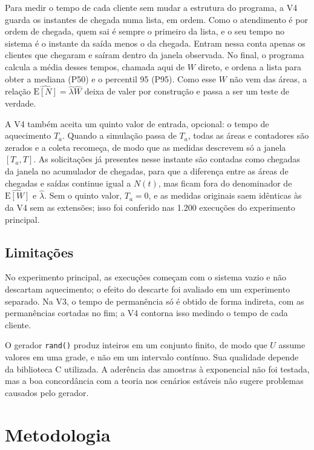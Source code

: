 \documentclass[
  article,      %
  10pt,         %
  oneside,
  a4paper,
  twocolumn,    %
  english,
  brazil        %
]{abntex2}
\newcommand{\EN}{\mathrm{E}[N]}
\newcommand{\EW}{\mathrm{E}[W]}
\begin{document}
Para medir o tempo de cada cliente sem mudar a estrutura do programa, a V4 guarda os instantes de chegada numa lista, em ordem. Como o atendimento é por ordem de chegada, quem sai é sempre o primeiro da lista, e o seu tempo no sistema é o instante da saída menos o da chegada. Entram nessa conta apenas os clientes que chegaram e saíram dentro da janela observada. No final, o programa calcula a média desses tempos, chamada aqui de $W$ direto, e ordena a lista para obter a mediana (P50) e o percentil 95 (P95). Como esse $W$ não vem das áreas, a relação $\widehat{\EN}=\widehat{\lambda}\widehat{W}$ deixa de valer por construção e passa a ser um teste de verdade.

A V4 também aceita um quinto valor de entrada, opcional: o tempo de aquecimento $T_a$. Quando a simulação passa de $T_a$, todas as áreas e contadores são zerados e a coleta recomeça, de modo que as medidas descrevem só a janela $[T_a,T]$. As solicitações já presentes nesse instante são contadas como chegadas da janela no acumulador de chegadas, para que a diferença entre as áreas de chegadas e saídas continue igual a $N(t)$, mas ficam fora do denominador de $\widehat{\EW}$ e $\widehat{\lambda}$. Sem o quinto valor, $T_a=0$, e as medidas originais saem idênticas às da V4 sem as extensões; isso foi conferido nas 1.200 execuções do experimento principal.

\subsection{Limitações}

No experimento principal, as execuções começam com o sistema vazio e não descartam aquecimento; o efeito do descarte foi avaliado em um experimento separado. Na V3, o tempo de permanência só é obtido de forma indireta, com as permanências cortadas no fim; a V4 contorna isso medindo o tempo de cada cliente.

O gerador \texttt{rand()} produz inteiros em um conjunto finito, de modo que $U$ assume valores em uma grade, e não em um intervalo contínuo. Sua qualidade depende da biblioteca C utilizada. A aderência das amostras à exponencial não foi testada, mas a boa concordância com a teoria nos cenários estáveis não sugere problemas causados pelo gerador.


\section{Metodologia}
\end{document}
